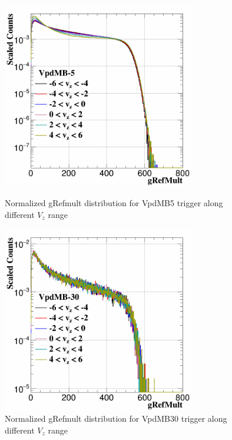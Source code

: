 \begin{figure}[htbp]
\begin{minipage}[htbp]{0.52\linewidth}
\centering
\includegraphics[width=0.75\textwidth]{figure/Run14_D0HFT/MB5_gref.png}
\caption{Normalized gRefmult distribution for VpdMB5 trigger along different $V_{z}$ range\label{fig:MB5_vz}}
\end{minipage}
\hfill
\begin{minipage}[htbp]{0.52\linewidth}
\centering
\includegraphics[width=0.75\textwidth]{figure/Run14_D0HFT/MB30_gref.png} 
\caption{Normalized gRefmult distribution for VpdMB30 trigger along different $V_{z}$ range\label{fig:MB30_vz}}
\end{minipage}
\end{figure}

